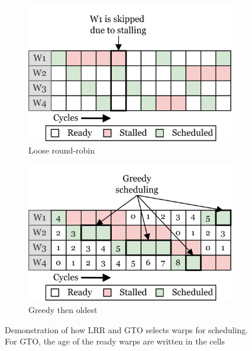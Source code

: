 \begin{figure}
     \centering
     \begin{subfigure}[b]{0.49\textwidth}
         \centering
         \includegraphics[width=\textwidth]{figures/warp-scheduling-lrr-2.png}
         \caption{Loose round-robin}
         \label{fig:lrr}
     \end{subfigure}
     \hfill
     \begin{subfigure}[b]{0.49\textwidth}
         \centering
         \includegraphics[width=\textwidth]{figures/warp-scheduling-gto-2.png}
         \caption{Greedy then oldest}
         \label{fig:gto}
     \end{subfigure}
    \caption{Demonstration of how LRR and GTO selects warps for scheduling. For GTO, the age of the ready warps are written in the cells}
    \label{fig:lrr_gto}
\end{figure}

